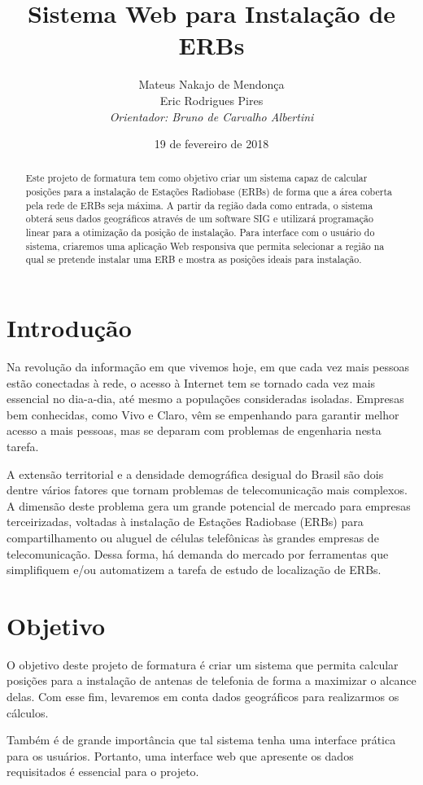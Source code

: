\documentclass[12pt,a4paper]{article}
\title{Sistema Web para Instalação de ERBs}
\author{Mateus Nakajo de Mendonça  \\
	Eric Rodrigues Pires  \\
	\em{Orientador: Bruno de Carvalho Albertini}
	}
\date{19 de fevereiro de 2018}
\begin{document}
\maketitle

\begin{abstract}
Este projeto de formatura tem como objetivo criar um sistema capaz de calcular
posições para a instalação de Estações Radiobase (ERBs) de forma que a área
coberta pela rede de ERBs seja máxima. A partir da região dada como entrada, o
sistema obterá seus dados geográficos através de um software SIG e utilizará
programação linear para a otimização da posição de instalação. Para interface
com o usuário do sistema, criaremos uma aplicação Web responsiva que permita
selecionar a região na qual se pretende instalar uma ERB e mostra as posições
ideais para instalação.
\end{abstract}

\section{Introdução}
Na revolução da informação em que vivemos hoje, em que cada vez mais pessoas
estão conectadas à rede, o acesso à Internet tem se tornado cada vez mais
essencial no dia-a-dia, até mesmo a populações consideradas isoladas. Empresas
bem conhecidas, como Vivo e Claro, vêm se empenhando para garantir melhor
acesso a mais pessoas, mas se deparam com problemas de engenharia nesta
tarefa.

A extensão territorial e a densidade demográfica desigual do Brasil são dois
dentre vários fatores que tornam problemas de telecomunicação mais complexos.
A dimensão deste problema gera um grande potencial de mercado para empresas
terceirizadas, voltadas à instalação de Estações Radiobase (ERBs) para
compartilhamento ou aluguel de células telefônicas às grandes empresas de
telecomunicação. Dessa forma, há demanda do mercado por ferramentas que
simplifiquem e/ou automatizem a tarefa de estudo de localização de ERBs.

\section{Objetivo}
O objetivo deste projeto de formatura é criar um sistema que permita calcular
posições para a instalação de antenas de telefonia de forma a maximizar o
alcance delas. Com esse fim, levaremos em conta dados geográficos para
realizarmos os cálculos.

Também é de grande importância que tal sistema tenha uma interface prática
para os usuários. Portanto, uma interface web que apresente os dados
requisitados é essencial para o projeto.
\end{document}
